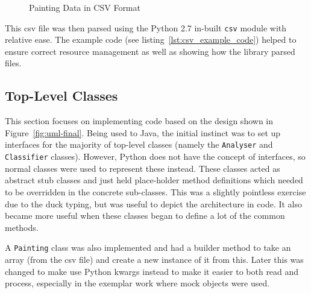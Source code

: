 \begin{table}[h]
\caption{Layout of the Painting Data Spreadsheet}\label{tab:spreadsheet-format}
\end{table}

\begin{figure}[h]
\caption{Painting Data in CSV Format}\label{fig:csv-spreadsheet}
\end{figure}

This \gls{csv} file was then parsed using the Python 2.7 in-built \texttt{csv} module with 
relative ease. The example code (see listing~\ref{lst:csv_example_code}) helped to ensure correct
resource management as well as showing how the library parsed files.


\subsection{Top-Level Classes}
This section focuses on implementing code based on the design shown in Figure~\ref{fig:uml-final}.
Being used to Java, the initial instinct was to set up interfaces for the majority of 
top-level classes (namely the \texttt{Analyser} and \texttt{Classifier} classes). However, 
Python does not have the concept of interfaces, so normal classes were used to represent these
instead. These classes acted as abstract stub classes and just held place-holder method definitions
which needed to be overridden in the concrete sub-classes. This was a slightly pointless exercise 
due to the duck typing, but was useful to depict the architecture in code. It also became more 
useful when these classes began to define a lot of the common methods.

A \texttt{Painting} class was also implemented and had a builder method to take an array (from the
\gls{csv} file) and create a new instance of it from this. Later this was changed to make use 
Python \gls{kwargs} instead to make it easier to both read and process, especially in the exemplar
work where mock objects were used.


